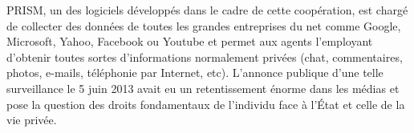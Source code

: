 \documentclass[article, french]{yReport}
\begin{document}
PRISM, un des logiciels développés dans le cadre de cette coopération, est chargé de collecter des données de toutes les grandes entreprises du net comme Google, Microsoft, Yahoo, Facebook ou Youtube et permet aux agents l'employant d'obtenir toutes sortes d'informations normalement privées (chat, commentaires, photos, e-mails, téléphonie par Internet, etc). L'annonce publique d'une telle surveillance le 5 juin 2013 avait eu un retentissement énorme dans les médias et pose la question des droits fondamentaux de l'individu face à l'État et celle de la vie privée.
	
	
\end{document}
